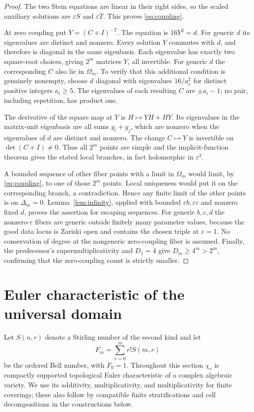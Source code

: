 \documentclass[11pt]{article}
\theoremstyle{remark}\newtheorem{remark}[theorem]{Remark}
\begin{document}
\begin{proof}
The two Stein equations are linear in their right sides, so the scaled auxiliary solutions are $\varepsilon S$ and $\varepsilon T$. This proves \eqref{eq:coupling}.

At zero coupling put $Y=(C+I)^{-T}$. The equation is $16Y^2=d$. For generic $d$ its eigenvalues are distinct and nonzero. Every solution $Y$ commutes with $d$, and therefore is diagonal in the same eigenbasis. Each eigenvalue has exactly two square-root choices, giving $2^m$ matrices $Y$, all invertible. For generic $d$ the corresponding $C$ also lie in $\Omega_m$. To verify that this additional condition is genuinely nonempty, choose $d$ diagonal with eigenvalues $16/a_i^2$ for distinct positive integers $a_i\ge5$. The eigenvalues of each resulting $C$ are $\pm a_i-1$; no pair, including repetition, has product one.

The derivative of the square map at $Y$ is $H\mapsto YH+HY$. Its eigenvalues in the matrix-unit eigenbasis are all sums $y_i+y_j$, which are nonzero when the eigenvalues of $d$ are distinct and nonzero. The change $C\mapsto Y$ is invertible on $\det(C+I)\ne0$. Thus all $2^m$ points are simple and the implicit-function theorem gives the stated local branches, in fact holomorphic in $\varepsilon^2$.

A bounded sequence of other fiber points with a limit in $\Omega_m$ would limit, by \eqref{eq:coupling}, to one of those $2^m$ points. Local uniqueness would put it on the corresponding branch, a contradiction. Hence any finite limit of the other points is on $\Delta_m=0$. Lemma~\ref{lem:infinity}, applied with bounded $\varepsilon b,\varepsilon c$ and nonzero fixed $d$, proves the assertion for escaping sequences. For generic $b,c,d$ the nonzero-$\varepsilon$ fibers are generic outside finitely many parameter values, because the good data locus is Zariski open and contains the chosen triple at $\varepsilon=1$. No conservation of degree at the nongeneric zero-coupling fiber is assumed. Finally, the predecessor's supermultiplicativity and $D_1=4$ give $D_m\ge4^m>2^m$, confirming that the zero-coupling count is strictly smaller.
\end{proof}

\section{Euler characteristic of the universal domain}\label{sec:euler}
Let $S(n,r)$ denote a Stirling number of the second kind and let
\[
F_m=\sum_{r=0}^m r!S(m,r)
\]
be the ordered Bell number, with $F_0=1$. Throughout this section $\chi_c$ is compactly supported topological Euler characteristic of a complex algebraic variety. We use its additivity, multiplicativity, and multiplicativity for finite coverings; these also follow by compatible finite stratifications and cell decompositions in the constructions below.
\end{document}
